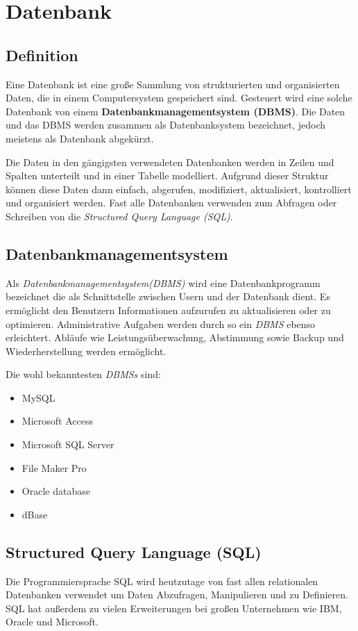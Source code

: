 \section{Datenbank}
\subsection{Definition}
Eine Datenbank ist eine große Sammlung von strukturierten und organisierten Daten,
die in einem Computersystem gespeichert sind. Gesteuert wird eine solche Datenbank von
einem \textbf{Datenbankmanagementsystem (DBMS)}. Die Daten und das DBMS werden zusammen als
Datenbanksystem bezeichnet, jedoch meistens als Datenbank abgekürzt.

Die Daten in den gängigsten verwendeten Datenbanken werden in Zeilen und Spalten unterteilt und
in einer Tabelle modelliert. Aufgrund dieser Struktur können diese Daten dann einfach, abgerufen,
modifiziert, aktualisiert, kontrolliert und organisiert werden. Fast alle Datenbanken verwenden
zum Abfragen oder Schreiben von die \textit{Structured Query Language (SQL)}.
\cite{Datenbank}

\subsection{Datenbankmanagementsystem}
Als \textit{Datenbankmanagementsystem(DBMS)} wird eine Datenbankprogramm bezeichnet die als Schnittstelle
zwischen Usern und der Datenbank dient. Es ermöglicht den Benutzern
Informationen aufzurufen zu aktualisieren oder zu optimieren. Administrative Aufgaben
werden durch so ein \textit{DBMS} ebenso erleichtert. Abläufe wie Leistungsüberwachung,
Abstimmung sowie Backup und Wiederherstellung werden ermöglicht.

Die wohl bekanntesten \textit{DBMSs} sind:

\begin{itemize}
    \item  MySQL
    \item Microsoft Access
    \item Microsoft SQL Server
    \item File Maker Pro
    \item Oracle database
    \item dBase
\end{itemize}

\subsection{Structured Query Language (SQL)}
Die Programmiersprache SQL wird heutzutage von fast allen relationalen Datenbanken verwendet
um Daten Abzufragen, Manipulieren und zu Definieren. SQL hat außerdem zu vielen Erweiterungen
bei großen Unternehmen wie IBM, Oracle und Microsoft.

